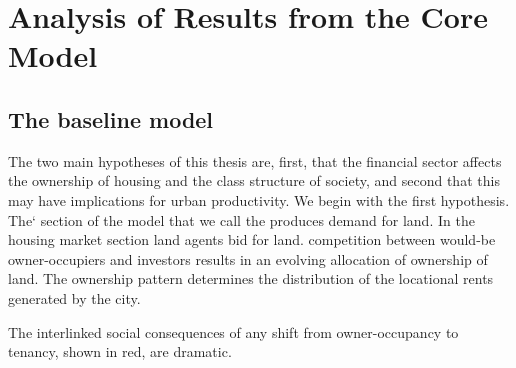 \chapter{Analysis of Results from the Core Model} \label{chapter-analysis}


\section{The baseline model} 
The two main hypotheses of this thesis are, first,  that the financial sector affects the ownership of housing and the class structure of society, and second that this may have implications for urban productivity. We begin with the first hypothesis. The` section of the model that we call the produces demand for land. In the housing market section land agents bid for land. competition between would-be owner-occupiers and investors results in an evolving allocation of ownership of land. The ownership pattern determines the distribution of the locational rents generated by the city.

\begin{center}

\end{center}

The interlinked social consequences of any shift from owner-occupancy to tenancy, shown in red, are dramatic. 



